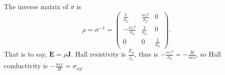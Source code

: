 \documentclass[12pt]{article}
\begin{document}
The inverse matrix of $\sigma$ is
\begin{equation}
	\rho = \sigma^{-1} = \begin{pmatrix}
	\frac{1}{\sigma_0} & \frac{\omega_c\tau}{\sigma_0} & 0\\
	-\frac{\omega_c\tau}{\sigma_0} & \frac{1}{\sigma_0} & 0\\
	0 & 0 & \frac{1}{\sigma_0}
	\end{pmatrix}.
\end{equation}
That is to say, $\bm{E} = \rho\bm{J}$.
Hall resistivity is $\frac{E_y}{j_x}$, thus is $ -\frac{\omega_c\tau}{\sigma_0} = -\frac{H}{nec}$, so Hall conductivity is
$-\frac{nec}{H} = \sigma_{xy}$.



\end{document}
